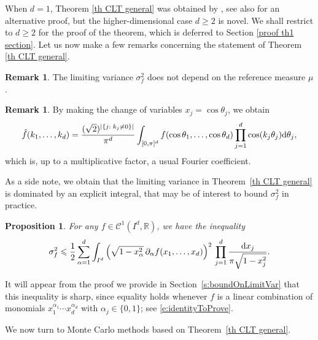 \documentclass[a4paper,11pt]{article}
\numberwithin{equation}{section}
\newtheorem{proposition}[]{Proposition}
\theoremstyle{definition}
\newtheorem{Remark}[]{Remark}
\newenvironment{remark}{\begin{Remark}\rm}{\end{Remark}}
\newcommand{\rev}[1]{#1}
\newcommand{\eq}{\begin{equation}}
\newcommand{\qe}{\end{equation}}
\newcommand{\R}{\mathbb{R}}
\renewcommand{\leq}{\leqslant}
\renewcommand{\geq}{\geqslant}
\renewcommand{\d}{ {\rm d}}
\begin{document}
When $d=1$, Theorem \ref{th CLT general} was obtained by \cite{BrDu13}, see also
\citep{Lam15b} for an alternative proof, but the higher-dimensional case $d\geq
2$ is novel. We shall restrict to $d\geq 2$ for the proof of the theorem, which
is deferred to Section \ref{proof th1 section}. Let us now make a few remarks
concerning the statement of Theorem \ref{th CLT general}.

\begin{remark} The limiting variance $\sigma_f^2$ does not depend on the reference measure $\mu$. \end{remark}

\begin{remark} By making the change of variables $x_j=\cos\theta_j$, we obtain
$$
\hat f(k_1,\ldots,k_d)=\frac {(\sqrt 2)^{|\{ j :\; k_j\neq 0 \}|}}{\pi^{d}}\int_{[0,\pi]^d} f(\cos\theta_1,\ldots,\cos\theta_d)\prod_{j=1}^d \cos(k_j\theta_j)\d \theta_j,
$$
which is, up to a multiplicative factor, a usual Fourier coefficient.
\end{remark}


\rev{As a side note, we obtain that the limiting variance in Theorem~\ref{th CLT general} is dominated by an explicit integral, that may be of interest to bound $\sigma_f^2$ in practice.}
\begin{proposition}
\label{bound limit var}
For any $f\in\mathscr C^1(I^d,\R)$,  we have the inequality
\eq
\label{Poincare ineq2}
\sigma_f^2   \leq \frac 1{2} \sum_{\alpha=1}^d \int_{I^d}  \Big( \sqrt{1-x_\alpha^2}\,\partial_\alpha f(x_1,\ldots,x_d)\Big)^2 \,\prod_{j=1}^d\frac{\d x_j}{\pi\sqrt{1-x_j^2}}.
\qe
\end{proposition}

It will appear from the proof we provide in Section~\ref{s:boundOnLimitVar} that this inequality is sharp, since equality holds whenever $f$ is a linear combination of monomials $x_1^{\alpha_1}\cdots x_d^{\alpha_d}$ with $\alpha_j\in\{0,1\}$; see \eqref{e:identityToProve}.


We now turn to Monte Carlo methods based on Theorem~\ref{th CLT general}.
\end{document}
